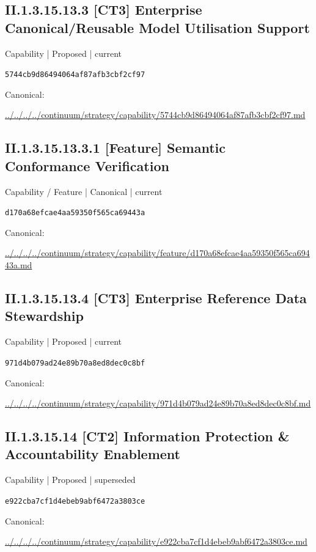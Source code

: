 \documentclass[10pt,a4paper]{article}
\begin{document}
\subsection*{II.1.3.15.13.3 [CT3] Enterprise Canonical/Reusable Model Utilisation Support}
{\small Capability | Proposed | current}\par
\texttt{5744cb9d86494064af87afb3cbf2cf97}\par
Canonical: \par
{\footnotesize\url{../../../../continuum/strategy/capability/5744cb9d86494064af87afb3cbf2cf97.md}}\par
\subsection*{II.1.3.15.13.3.1 [Feature] Semantic Conformance Verification}
{\small Capability / Feature | Canonical | current}\par
\texttt{d170a68efcae4aa59350f565ca69443a}\par
Canonical: \par
{\footnotesize\url{../../../../continuum/strategy/capability/feature/d170a68efcae4aa59350f565ca69443a.md}}\par
\subsection*{II.1.3.15.13.4 [CT3] Enterprise Reference Data Stewardship}
{\small Capability | Proposed | current}\par
\texttt{971d4b079ad24e89b70a8ed8dec0c8bf}\par
Canonical: \par
{\footnotesize\url{../../../../continuum/strategy/capability/971d4b079ad24e89b70a8ed8dec0c8bf.md}}\par
\subsection*{II.1.3.15.14 [CT2] Information Protection \& Accountability Enablement}
{\small Capability | Proposed | superseded}\par
\texttt{e922cba7cf1d4ebeb9abf6472a3803ce}\par
Canonical: \par
{\footnotesize\url{../../../../continuum/strategy/capability/e922cba7cf1d4ebeb9abf6472a3803ce.md}}\par
\end{document}
